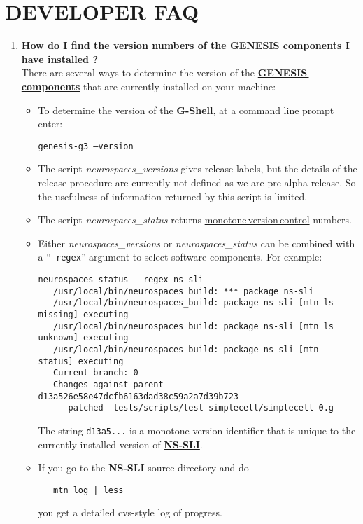 \documentclass[12pt]{article}
\begin{document}
\section*{DEVELOPER FAQ}

\begin{enumerate}

\item {\bf How do I find the version numbers of the GENESIS components I have installed ?} \\
There are several ways to determine the version of the \href{../reserved-words/reserved-words.tex}{\bf GENESIS\,components} that are currently installed on your machine:
\begin{itemize}
\item To determine the version of the {\bf G-Shell}, at a command line prompt enter:

{\tt genesis-g3 --version}

\item The script {\it neurospaces\_versions} gives release labels, but the details
of the release procedure are currently not defined as we are pre-alpha release.  So the usefulness of information returned by this script is limited.

\item The script {\it neurospaces\_status} returns \href{../version-control/version-control.tex}{monotone\,version\,control} numbers.

\item Either {\it neurospaces\_versions} or {\it neurospaces\_status} can be combined with a ``{\tt --regex}'' argument to select
software components.  For example:

\begin{verbatim}
neurospaces_status --regex ns-sli
   /usr/local/bin/neurospaces_build: *** package ns-sli
   /usr/local/bin/neurospaces_build: package ns-sli [mtn ls missing] executing
   /usr/local/bin/neurospaces_build: package ns-sli [mtn ls unknown] executing
   /usr/local/bin/neurospaces_build: package ns-sli [mtn status] executing
   Current branch: 0
   Changes against parent d13a526e58e47dcfb6163dad38c59a2a7d39b723
      patched  tests/scripts/test-simplecell/simplecell-0.g
\end{verbatim}

The string {\tt d13a5...} is a monotone version identifier that is unique to the currently installed version of \href{../nssli/nssli.tex}{\bf NS-SLI}.

\item If you go to the {\bf NS-SLI} source directory and do
\begin{verbatim}
   mtn log | less
\end{verbatim}
you get a detailed cvs-style log of progress.

\end{itemize}
\end{enumerate}
\end{document}
